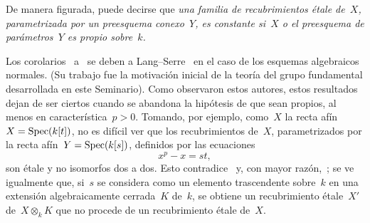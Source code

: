 De manera figurada, puede decirse que \emph{una familia de recubrimientos
étale de~$X$, parametrizada por un preesquema conexo~$Y$, es constante si~$X$
o el preesquema de parámetros~$Y$ es propio sobre~$k$.}

\begin{remarques}
\label{X.1.10}
Los corolarios~ a~ se deben a
Lang--Serre~\cite{X.2} en el caso de los esquemas algebraicos normales. (Su
trabajo fue la motivación inicial de la teoría del grupo fundamental
desarrollada en este Seminario). Como observaron estos autores, estos
resultados dejan de ser ciertos cuando se abandona la hipótesis de que sean
propios, al menos en característica~$p>0$. Tomando, por ejemplo, como~$X$ la
recta afín~$X=\operatorname{Spec}(k[t])$, no es difícil ver que los recubrimientos de~$X$,
parametrizados por la recta afín~$Y=\operatorname{Spec}(k[s])$, definidos por las ecuaciones
$$
x^p - x = st,
$$
son étale y no isomorfos dos a dos. Esto contradice~ y, con mayor
razón,~; se ve igualmente que, si~$s$ se considera como un elemento
trascendente sobre~$k$ en una extensión algebraicamente cerrada~$K$ de~$k$,
se obtiene un recubrimiento étale~$X'$ de~$X\otimes_kK$ que no procede de un
recubrimiento étale de~$X$.
\end{remarques}
